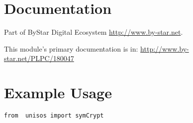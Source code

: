 \documentclass{article}
\begin{document}
\section{Documentation}

Part of ByStar Digital Ecosystem \url{http://www.by-star.net}.

This module's primary documentation is in: \url{http://www.by-star.net/PLPC/180047}


\section{Example Usage}

\begin{verbatim}
from  unisos import symCrypt
\end{verbatim}

\begin{comment}
*  [[elisp:(org-cycle)][| ]]  *DBLK: main-end*                                       :: [[elisp:(beginning-of-buffer)][Top]] [[elisp:(delete-other-windows)][(1)]]  [[elisp:(org-cycle)][| ]]
\end{comment}
\end{document}
